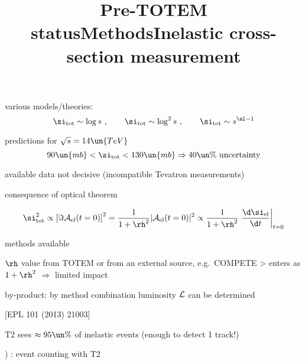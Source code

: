 \vfil
\newpage %
\title{Pre-TOTEM status}


\vfil
\> various models/theories:
$$\si_{\rm tot} \sim \log s\ ,\qquad \si_{\rm tot} \sim \log^2 s\ ,\qquad \si_{\rm tot} \sim s^{\al - 1}$$

\> predictions for $\sqrt{s} = 14\un{TeV}$
$$90\un{mb} < \si_{\rm tot} < 130\un{mb} \Rightarrow 40\un{\%}\hbox{ uncertainty}$$


\> available data not decisive (incompatible Tevatron measurements)

\vfil

\newpage %
\title{Methods}

\vskip-5mm

\> consequence of optical theorem

$$\si_{\rm tot}^2 \propto \left[ \Im {\cal A}_{\rm el}(t = 0) \right]^2 = {1\over 1 + \rh^2} |{\cal A_{\rm el}}(t = 0)|^2 \propto
{1\over 1 + \rh^2} \left. \d\si_{\rm el}\over \d t \right|_{t=0}
$$


\vfil
{} methods available
\vskip2mm

\vfil
\> $\rh$ value from TOTEM or from an external source, e.g.~COMPETE
\>> enters as $1+\rh^2$ $\Rightarrow$ limited impact

\vfil
\> by-product: by method combination luminosity $\cal L$ can be determined

\newpage %
\title{Inelastic cross-section measurement}

\vskip-3mm
\centerline{[EPL 101 (2013) 21003]}

\vfil
\> T2 sees $\approx 95\un{\%}$ of inelastic events (enough to detect 1 track!)

\vfil
{}) \cFg: event counting with T2

\vskip2mm
\vskip2mm

